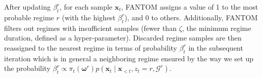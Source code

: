 After updating $\beta^r_{t}$, for each sample $\boldsymbol{x}_t$, FANTOM assigns a value of 1 to the most probable regime $r$ (with the highest $\beta^r_{t}$), and 0 to others. Additionally, FANTOM filters out regimes with insufficient samples (fewer than $\zeta$, the minimum regime duration, defined as a hyper-parameter). Discarded regime samples are then reassigned to the nearest regime in terms of probability $\beta^r_{t}$ in the subsequent iteration which is in general a neighboring regime ensured by the way we set up the probability $\beta^r_{t}\propto \pi_t(\boldsymbol{\omega}^{r}) p\left(\boldsymbol{x}_t \mid \boldsymbol{x}_{<t}, z_{t}=r, \mathcal{G}^r\right)$.